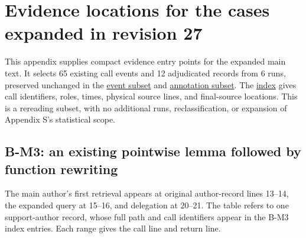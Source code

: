 \section[Evidence locations for the cases expanded in revision 27]{\texorpdfstring{\protect\hypertarget{appendix-t}{}Evidence locations for the cases expanded in revision 27}{Evidence locations for the cases expanded in revision 27}}
This appendix supplies compact evidence entry points for the expanded main text. It selects 65 existing call events and 12 adjudicated records from 6 runs, preserved unchanged in the \href{verification/revision27/expanded_case_events.jsonl}{event subset} and \href{verification/revision27/expanded_case_annotations.json}{annotation subset}. The \href{verification/revision27/expanded_case_index.json}{index} gives call identifiers, roles, times, physical source lines, and final-source locations. This is a rereading subset, with no additional runs, reclassification, or expansion of Appendix S's statistical scope.

\subsection[B-M3: an existing pointwise lemma followed by function rewriting]{\texorpdfstring{\protect\hypertarget{t1}{}B-M3: an existing pointwise lemma followed by function rewriting}{B-M3: an existing pointwise lemma followed by function rewriting}}
The main author's first retrieval appears at original author-record lines 13–14, the expanded query at 15–16, and delegation at 20–21. The table refers to one support-author record, whose full path and call identifiers appear in the B-M3 index entries. Each range gives the call line and return line.


